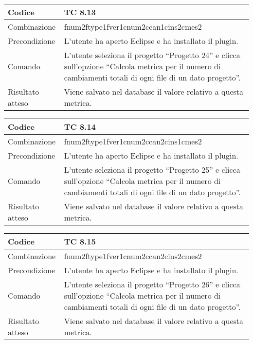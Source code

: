 \begin{table}[ht]
\begin{tabular}{|p{3cm}|p{9cm}|}
\hline
\cellcolor{lightgray}Codice				& TC 8.13								\\
\hline
\cellcolor{lightgray}Combinazione		& fnum2ftype1fver1cnum2ccan1cins2cmes2									\\
\hline
\cellcolor{lightgray}Precondizione		& L'utente ha aperto Eclipse e ha installato il plugin.		\\
\hline
\cellcolor{lightgray}Comando			& L'utente seleziona il progetto ``Progetto 24''  e clicca sull'opzione ``Calcola metrica per il numero di cambiamenti totali di ogni file di un dato progetto''.	\\
\hline
\cellcolor{lightgray}Risultato atteso	& Viene salvato nel database il valore relativo a questa metrica.\\
\hline
\end{tabular}
\end{table}

\begin{table}[ht]
\begin{tabular}{|p{3cm}|p{9cm}|}
\hline
\cellcolor{lightgray}Codice				& TC 8.14								\\
\hline
\cellcolor{lightgray}Combinazione		& fnum2ftype1fver1cnum2ccan2cins1cmes2									\\
\hline
\cellcolor{lightgray}Precondizione		& L'utente ha aperto Eclipse e ha installato il plugin.		\\
\hline
\cellcolor{lightgray}Comando			& L'utente seleziona il progetto ``Progetto 25''  e clicca sull'opzione ``Calcola metrica per il numero di cambiamenti totali di ogni file di un dato progetto''.	\\
\hline
\cellcolor{lightgray}Risultato atteso	& Viene salvato nel database il valore relativo a questa metrica.\\
\hline
\end{tabular}
\end{table}

\clearpage

\begin{table}[ht]
\begin{tabular}{|p{3cm}|p{9cm}|}
\hline
\cellcolor{lightgray}Codice				& TC 8.15								\\
\hline
\cellcolor{lightgray}Combinazione		& fnum2ftype1fver1cnum2ccan2cins2cmes2									\\
\hline
\cellcolor{lightgray}Precondizione		& L'utente ha aperto Eclipse e ha installato il plugin.		\\
\hline
\cellcolor{lightgray}Comando			& L'utente seleziona il progetto ``Progetto 26''  e clicca sull'opzione ``Calcola metrica per il numero di cambiamenti totali di ogni file di un dato progetto''.	\\
\hline
\cellcolor{lightgray}Risultato atteso	& Viene salvato nel database il valore relativo a questa metrica.\\
\hline
\end{tabular}
\end{table}

